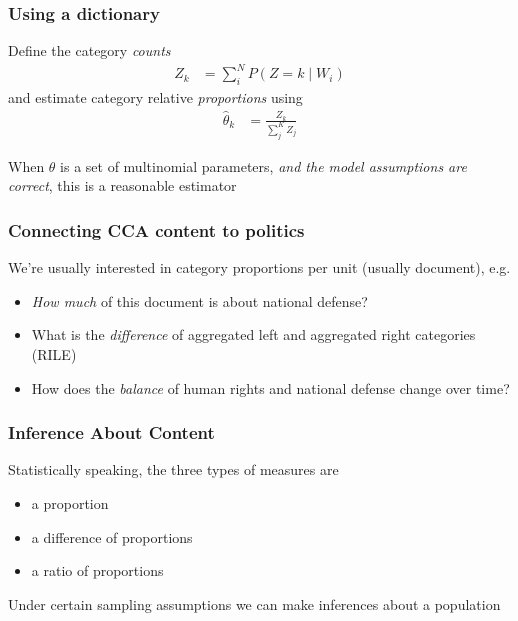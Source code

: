 \documentclass[11pt,compress,professionalfonts]{beamer}
\newcommand{\ita}{\begin{itemize}}
\newcommand{\itm}{\item[]}
\newcommand{\itz}{\end{itemize}}
\begin{document}
\begin{frame}[t,fragile]\frametitle{Using a dictionary}

Define the category \textit{counts}
\begin{align*}
Z_k & = \sum^N_{i} P(Z = k \mid W_i)
\end{align*}
and estimate category relative \textit{proportions} using
\begin{align*}
\hat{\theta}_k &= \frac{Z_k}{\sum^K_{j} Z_j}
\end{align*}

When $\theta$ is a set of multinomial parameters, \textit{and the model assumptions are correct},
this is a reasonable estimator




\end{frame}
\begin{frame}[t,fragile]\frametitle{Connecting CCA content to politics}

We're usually interested in category proportions per unit (usually document), e.g.
\ita
\itm \textsl{How much} of this document is about national defense?
\itm What is the \textsl{difference} of aggregated left and aggregated right categories (RILE)
\itm How does the \textsl{balance} of human rights and national defense change over time?
\itz


\end{frame}
\begin{frame}[t,fragile]\frametitle{Inference About Content}

Statistically speaking, the three types of measures are
\ita
\itm a proportion
\itm a difference of proportions
\itm a ratio of proportions
\itz
Under certain sampling assumptions we can make inferences about a population

%

\end{frame}
\end{document}
